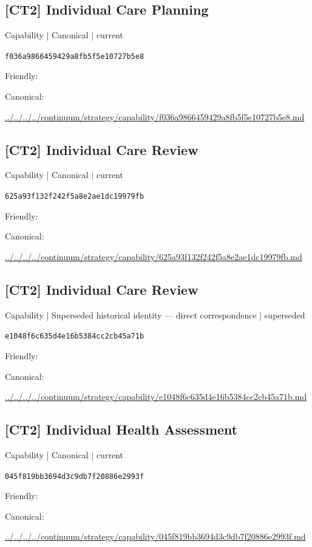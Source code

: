 \documentclass[10pt,a4paper]{article}
\begin{document}
\subsection*{[CT2] Individual Care Planning}
{\small Capability | Canonical | current}\par
\texttt{f036a9866459429a8fb5f5e10727b5e8}\par
Friendly: \par
Canonical: \par
{\footnotesize\url{../../../../continuum/strategy/capability/f036a9866459429a8fb5f5e10727b5e8.md}}\par
\subsection*{[CT2] Individual Care Review}
{\small Capability | Canonical | current}\par
\texttt{625a93f132f242f5a8e2ae1dc19979fb}\par
Friendly: \par
Canonical: \par
{\footnotesize\url{../../../../continuum/strategy/capability/625a93f132f242f5a8e2ae1dc19979fb.md}}\par
\subsection*{[CT2] Individual Care Review}
{\small Capability | Superseded historical identity — direct correspondence | superseded}\par
\texttt{e1048f6c635d4e16b5384cc2cb45a71b}\par
Friendly: \par
Canonical: \par
{\footnotesize\url{../../../../continuum/strategy/capability/e1048f6c635d4e16b5384cc2cb45a71b.md}}\par
\subsection*{[CT2] Individual Health Assessment}
{\small Capability | Canonical | current}\par
\texttt{045f819bb3694d3c9db7f20886e2993f}\par
Friendly: \par
Canonical: \par
{\footnotesize\url{../../../../continuum/strategy/capability/045f819bb3694d3c9db7f20886e2993f.md}}\par
\end{document}
